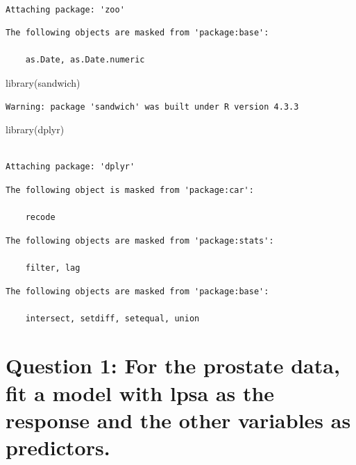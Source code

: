 \documentclass[
  letterpaper,
  DIV=11,
  numbers=noendperiod]{scrartcl}
\newenvironment{Shaded}{\begin{snugshade}}{\end{snugshade}}
\newcommand{\FunctionTok}[1]{\textcolor[rgb]{0.28,0.35,0.67}{#1}}
\newcommand{\NormalTok}[1]{\textcolor[rgb]{0.00,0.23,0.31}{#1}}
\begin{document}
\begin{verbatim}

Attaching package: 'zoo'
\end{verbatim}

\begin{verbatim}
The following objects are masked from 'package:base':

    as.Date, as.Date.numeric
\end{verbatim}

\begin{Shaded}
\begin{Highlighting}[]
\FunctionTok{library}\NormalTok{(sandwich)}
\end{Highlighting}
\end{Shaded}

\begin{verbatim}
Warning: package 'sandwich' was built under R version 4.3.3
\end{verbatim}

\begin{Shaded}
\begin{Highlighting}[]
\FunctionTok{library}\NormalTok{(dplyr)}
\end{Highlighting}
\end{Shaded}

\begin{verbatim}

Attaching package: 'dplyr'
\end{verbatim}

\begin{verbatim}
The following object is masked from 'package:car':

    recode
\end{verbatim}

\begin{verbatim}
The following objects are masked from 'package:stats':

    filter, lag
\end{verbatim}

\begin{verbatim}
The following objects are masked from 'package:base':

    intersect, setdiff, setequal, union
\end{verbatim}

\hypertarget{question-1-for-the-prostate-data-fit-a-model-with-lpsa-as-the-response-and-the-other-variables-as-predictors.}{%
\section{Question 1: For the prostate data, fit a model with lpsa as the
response and the other variables as
predictors.}\label{question-1-for-the-prostate-data-fit-a-model-with-lpsa-as-the-response-and-the-other-variables-as-predictors.}}
\end{document}
